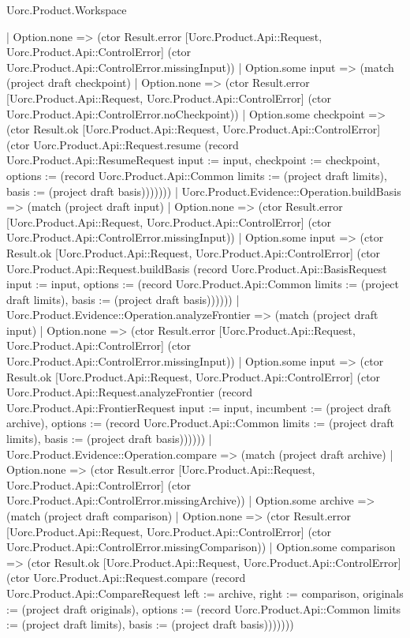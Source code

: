 \begin{lexlean}{Uorc.Product.Workspace}
\begin{semanticmodule}
{      | Option.none => (ctor Result.error [Uorc.Product.Api::Request, Uorc.Product.Api::ControlError] (ctor Uorc.Product.Api::ControlError.missingInput))
      | Option.some input => (match (project draft checkpoint)
        | Option.none => (ctor Result.error [Uorc.Product.Api::Request, Uorc.Product.Api::ControlError] (ctor Uorc.Product.Api::ControlError.noCheckpoint))
        | Option.some checkpoint => (ctor Result.ok [Uorc.Product.Api::Request, Uorc.Product.Api::ControlError] (ctor Uorc.Product.Api::Request.resume (record Uorc.Product.Api::ResumeRequest {input := input, checkpoint := checkpoint, options := (record Uorc.Product.Api::Common {limits := (project draft limits), basis := (project draft basis)})})))))
    | Uorc.Product.Evidence::Operation.buildBasis => (match (project draft input)
      | Option.none => (ctor Result.error [Uorc.Product.Api::Request, Uorc.Product.Api::ControlError] (ctor Uorc.Product.Api::ControlError.missingInput))
      | Option.some input => (ctor Result.ok [Uorc.Product.Api::Request, Uorc.Product.Api::ControlError] (ctor Uorc.Product.Api::Request.buildBasis (record Uorc.Product.Api::BasisRequest {input := input, options := (record Uorc.Product.Api::Common {limits := (project draft limits), basis := (project draft basis)})}))))
    | Uorc.Product.Evidence::Operation.analyzeFrontier => (match (project draft input)
      | Option.none => (ctor Result.error [Uorc.Product.Api::Request, Uorc.Product.Api::ControlError] (ctor Uorc.Product.Api::ControlError.missingInput))
      | Option.some input => (ctor Result.ok [Uorc.Product.Api::Request, Uorc.Product.Api::ControlError] (ctor Uorc.Product.Api::Request.analyzeFrontier (record Uorc.Product.Api::FrontierRequest {input := input, incumbent := (project draft archive), options := (record Uorc.Product.Api::Common {limits := (project draft limits), basis := (project draft basis)})}))))
    | Uorc.Product.Evidence::Operation.compare => (match (project draft archive)
      | Option.none => (ctor Result.error [Uorc.Product.Api::Request, Uorc.Product.Api::ControlError] (ctor Uorc.Product.Api::ControlError.missingArchive))
      | Option.some archive => (match (project draft comparison)
        | Option.none => (ctor Result.error [Uorc.Product.Api::Request, Uorc.Product.Api::ControlError] (ctor Uorc.Product.Api::ControlError.missingComparison))
        | Option.some comparison => (ctor Result.ok [Uorc.Product.Api::Request, Uorc.Product.Api::ControlError] (ctor Uorc.Product.Api::Request.compare (record Uorc.Product.Api::CompareRequest {left := archive, right := comparison, originals := (project draft originals), options := (record Uorc.Product.Api::Common {limits := (project draft limits), basis := (project draft basis)})})))))
}
\end{semanticmodule}
\end{lexlean}
